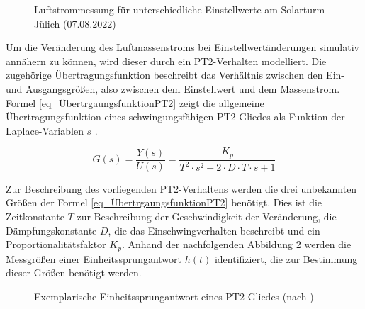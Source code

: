 \begin{figure}[h!]
    \centering
    \setlength{\fboxsep}{1pt}
    \setlength{\fboxrule}{1pt}
    \caption[Luftstrommessung für unterschiedliche Einstellwerte am Solarturm Jülich (07.08.2022)]{Luftstrommessung für unterschiedliche Einstellwerte am Solarturm Jülich (07.08.2022)}
    \label{fig_LuftstromSolarturm}
\end{figure}

Um die Veränderung des Luftmassenstroms bei Einstellwertänderungen simulativ annähern zu können, wird dieser durch ein PT2-Verhalten modelliert.
Die zugehörige Übertragungsfunktion beschreibt das Verhältnis zwischen den Ein- und Ausgangsgrößen, also zwischen dem Einstellwert und dem Massenstrom.
Formel \ref{eq_ÜbertrgaungsfunktionPT2} zeigt die allgemeine Übertragungsfunktion eines schwingungsfähigen PT2-Gliedes als Funktion der Laplace-Variablen $s$ \cite[S.60]{ProfMueller}.

\begin{equation} \label{eq_ÜbertrgaungsfunktionPT2}
    G(s)=\frac{Y(s)}{U(s)}=\frac{K_p}{T^2 \cdot s^2+2 \cdot D \cdot T \cdot s+1}
\end{equation}

Zur Beschreibung des vorliegenden PT2-Verhaltens werden die drei unbekannten Größen der Formel \ref{eq_ÜbertrgaungsfunktionPT2} benötigt.
Dies ist die Zeitkonstante $T$ zur Beschreibung der Geschwindigkeit der Veränderung, die Dämpfungskonstante $D$, die das Einschwingverhalten beschreibt und ein Proportionalitätsfaktor $K_p$.
Anhand der nachfolgenden Abbildung \ref{fig_SprungantwortSymbolisch} werden die Messgrößen einer Einheitssprungantwort $h(t)$ identifiziert, die zur Bestimmung dieser Größen benötigt werden.

\begin{figure}[h!]
    \centering
    \setlength{\fboxsep}{1pt}
    \setlength{\fboxrule}{1pt}
    \caption[Exemplarische Einheitssprungantwort eines PT2-Gliedes]{Exemplarische Einheitssprungantwort eines PT2-Gliedes (nach \cite[S.60]{ProfMueller})}
    \label{fig_SprungantwortSymbolisch}
\end{figure}


